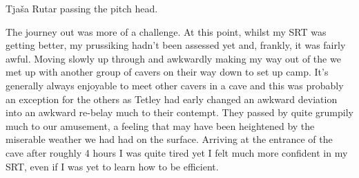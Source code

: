 \begin{marginfigure}
\checkoddpage \ifoddpage \forcerectofloat \else \forceversofloat \fi
\centering
 \caption{Tjaša Rutar passing the  pitch head. }
 \label{tjasa tessellator pitch head}
\end{marginfigure}


The journey out was more of a challenge. At this point, whilst my SRT
was getting better, my prussiking hadn't been assessed yet and, frankly,
it was fairly awful. Moving slowly up through  and awkwardly making
my way out of the  we met up with another group of cavers
on their way down to set up camp. It's generally always enjoyable to
meet other cavers in a cave and this was probably an exception for the
others as Tetley had early changed an awkward deviation into an awkward
re-belay much to their contempt. They passed by quite grumpily much to
our amusement, a feeling that may have been heightened by the miserable
weather we had had on the surface. Arriving at the entrance of the cave
after roughly 4 hours I was quite tired yet I felt much more confident
in my SRT, even if I was yet to learn how to be efficient.

